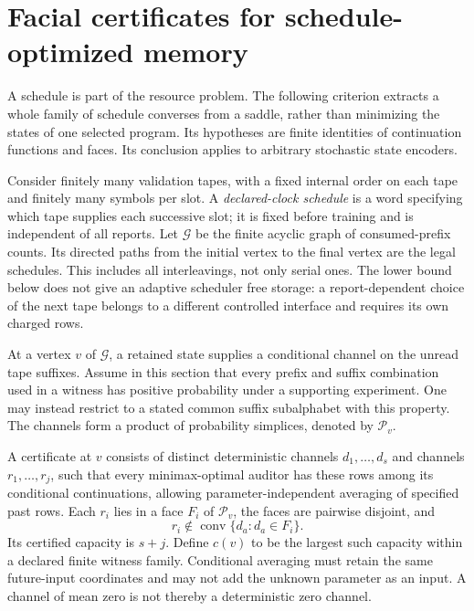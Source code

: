 \section{Facial certificates for schedule-optimized memory}
\label{sec:facial-scheduling}
A schedule is part of the resource problem. The following criterion
extracts a whole family of schedule converses from a saddle, rather than
minimizing the states of one selected program. Its hypotheses are finite
identities of continuation functions and faces. Its conclusion applies
to arbitrary stochastic state encoders.

Consider finitely many validation tapes, with a fixed internal order
on each tape and finitely many symbols per slot. A \emph{declared-clock
schedule} is a word specifying which tape supplies each successive
slot; it is fixed before training and is independent of all reports.
Let $\mathcal G$ be the finite acyclic graph of consumed-prefix counts.
Its directed paths from the initial vertex to the final vertex are the
legal schedules. This includes all interleavings, not only serial ones.
The lower bound below does not give an adaptive scheduler free storage:
a report-dependent choice of the next tape belongs to a different
controlled interface and requires its own charged rows.

At a vertex $v$ of $\mathcal G$, a retained state supplies a conditional
channel on the unread tape suffixes. Assume in this section that every
prefix and suffix combination used in a witness has positive probability
under a supporting experiment. One may instead restrict to a stated
common suffix subalphabet with this property. The channels form a
product of probability simplices, denoted by $\mathcal P_v$.

\begin{definition}
\label{def:facial-certificate}
A certificate at $v$ consists of distinct deterministic channels
$d_1,\ldots,d_s$ and channels $r_1,\ldots,r_j$, such that every
minimax-optimal auditor has these rows among its conditional
continuations, allowing parameter-independent averaging of specified
past rows. Each $r_i$ lies in a face $F_i$ of $\mathcal P_v$, the faces
are pairwise disjoint, and
\[
 r_i\notin\operatorname{conv}\{d_a:d_a\in F_i\}.
\]
Its certified capacity is $s+j$. Define $c(v)$ to be the largest such
capacity within a declared finite witness family. Conditional averaging
must retain the same future-input coordinates and may not add the
unknown parameter as an input. A channel of mean zero is not thereby a
deterministic zero channel.
\end{definition}

